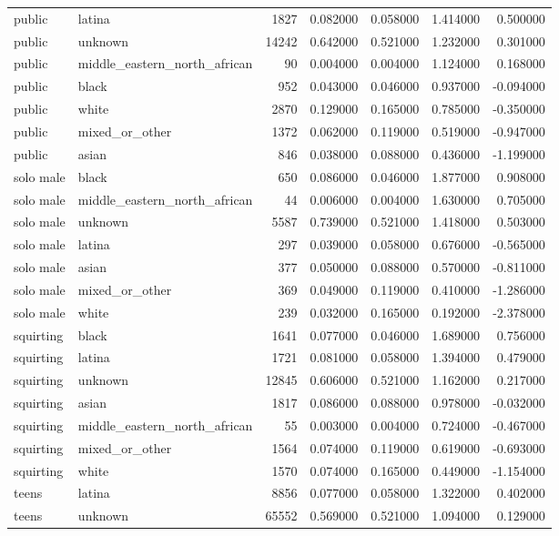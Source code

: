 \begin{tabular}{llrrrrr}
public & latina & 1827 & 0.082000 & 0.058000 & 1.414000 & 0.500000 \\
public & unknown & 14242 & 0.642000 & 0.521000 & 1.232000 & 0.301000 \\
public & middle_eastern_north_african & 90 & 0.004000 & 0.004000 & 1.124000 & 0.168000 \\
public & black & 952 & 0.043000 & 0.046000 & 0.937000 & -0.094000 \\
public & white & 2870 & 0.129000 & 0.165000 & 0.785000 & -0.350000 \\
public & mixed_or_other & 1372 & 0.062000 & 0.119000 & 0.519000 & -0.947000 \\
public & asian & 846 & 0.038000 & 0.088000 & 0.436000 & -1.199000 \\
solo male & black & 650 & 0.086000 & 0.046000 & 1.877000 & 0.908000 \\
solo male & middle_eastern_north_african & 44 & 0.006000 & 0.004000 & 1.630000 & 0.705000 \\
solo male & unknown & 5587 & 0.739000 & 0.521000 & 1.418000 & 0.503000 \\
solo male & latina & 297 & 0.039000 & 0.058000 & 0.676000 & -0.565000 \\
solo male & asian & 377 & 0.050000 & 0.088000 & 0.570000 & -0.811000 \\
solo male & mixed_or_other & 369 & 0.049000 & 0.119000 & 0.410000 & -1.286000 \\
solo male & white & 239 & 0.032000 & 0.165000 & 0.192000 & -2.378000 \\
squirting & black & 1641 & 0.077000 & 0.046000 & 1.689000 & 0.756000 \\
squirting & latina & 1721 & 0.081000 & 0.058000 & 1.394000 & 0.479000 \\
squirting & unknown & 12845 & 0.606000 & 0.521000 & 1.162000 & 0.217000 \\
squirting & asian & 1817 & 0.086000 & 0.088000 & 0.978000 & -0.032000 \\
squirting & middle_eastern_north_african & 55 & 0.003000 & 0.004000 & 0.724000 & -0.467000 \\
squirting & mixed_or_other & 1564 & 0.074000 & 0.119000 & 0.619000 & -0.693000 \\
squirting & white & 1570 & 0.074000 & 0.165000 & 0.449000 & -1.154000 \\
teens & latina & 8856 & 0.077000 & 0.058000 & 1.322000 & 0.402000 \\
teens & unknown & 65552 & 0.569000 & 0.521000 & 1.094000 & 0.129000 \\

\end{tabular}
